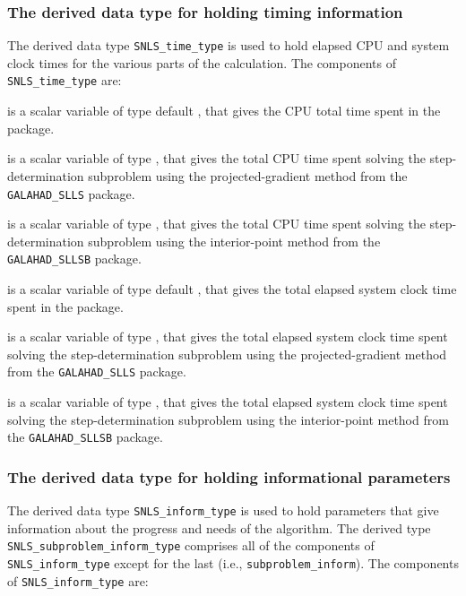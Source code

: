 \documentclass{galahad}
\newcommand{\packagename}{SNLS}
\begin{document}

\subsubsection{The derived data type for holding timing
 information}\label{typetime}
The derived data type
{\tt \packagename\_time\_type}
is used to hold elapsed CPU and system clock times for the various parts
of the calculation. The components of
{\tt \packagename\_time\_type}
are:
\begin{description}
 is a scalar variable of type default \realdp, that gives
 the CPU total time spent in the package.

 is a scalar variable of type \realdp, that gives
the total CPU time spent solving the step-determination subproblem
using the projected-gradient method from the {\tt GALAHAD\_SLLS} package.

 is a scalar variable of type \realdp, that gives
the total CPU time spent solving the step-determination subproblem
using the interior-point method from the {\tt GALAHAD\_SLLSB} package.

 is a scalar variable of type default \realdp, that gives
 the total elapsed system clock time spent in the package.

 is a scalar variable of type \realdp, that gives the total 
elapsed system clock time spent solving the step-determination subproblem
using the projected-gradient method from the {\tt GALAHAD\_SLLS} package.

 is a scalar variable of type \realdp, that gives the total 
elapsed system clock time spent solving the step-determination subproblem
using the interior-point method from the {\tt GALAHAD\_SLLSB} package.

\end{description}


\subsubsection{The derived data type for holding informational
 parameters}\label{typeinform}
The derived data type
{\tt \packagename\_inform\_type}
is used to hold parameters that give information about the progress and needs
of the algorithm.
The derived type {\tt \packagename\_subproblem\_inform\_type}
comprises all of the components of {\tt \packagename\_inform\_type}
except for the last (i.e., {\tt subproblem\_inform}).
The components of
{\tt \packagename\_inform\_type}
are:
\end{document}
